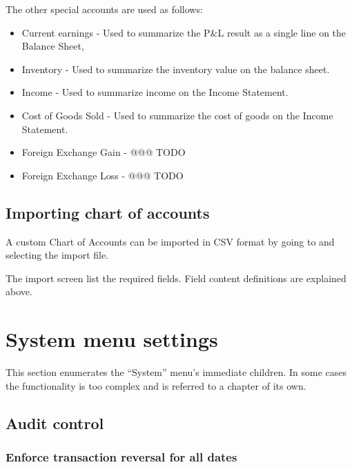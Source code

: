 The other special accounts are used as follows:

\begin{itemize}
    \item Current earnings - Used to summarize the P\&L result as a single line on the Balance Sheet,
    \item Inventory - Used to summarize the inventory value on the balance sheet.
    \item Income - Used to summarize income on the Income Statement.
    \item Cost of Goods Sold - Used to summarize the cost of goods on the Income Statement.
    \item Foreign Exchange Gain - @@@ TODO
    \item Foreign Exchange Loss - @@@ TODO
\end{itemize}

\subsection{Importing chart of accounts}
\label{subsec-coa-importing}

A custom Chart of Accounts can be imported in CSV format by going to  and selecting the import file.

The import screen list the required fields. Field content definitions are explained above.

\section{System menu settings}
\label{sec-company-config-system-menu}

This section enumerates the ``System'' menu's immediate children. In some cases the
functionality is too complex and is referred to a chapter of its own.

\subsection{Audit control}
\label{subsec-company-config-audit-control}

\subsubsection{Enforce transaction reversal for all dates}
\label{subsubsec-company-config-audit-control-reversals}


